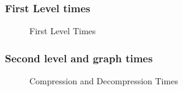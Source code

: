 \documentclass[article,dr=phil,type=drfinal,colorback,accentcolor=tud9c]{tudthesis}
\begin{document}
\subsubsection{First Level times}
\begin{figure}[!htb]
	\centering
	\hspace{10mm}
	\caption[First Level Times]{First Level Times}
	\label{fig:compdecomp}
\end{figure}

\subsubsection{Second level and graph times}
\begin{figure}[!htb]
	\centering
	\hspace{10mm}
	\caption[Compression and Decompression Times]{Compression and Decompression Times}
	\label{fig:compdecomp}
\end{figure}
\end{document}
